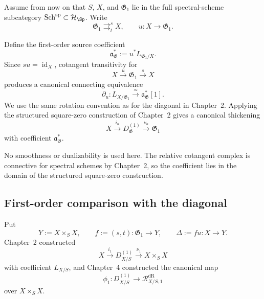 Assume from now on that $S$, $X$, and $\mathfrak G_1$ lie in the full
spectral-scheme subcategory $\operatorname{Sch}^{\mathrm{sp}}\subset
\mathcal H_{\Sp}$.  Write
\[
    \mathfrak G_1
    \mathop{\rightrightarrows}^{s}_{t}
    X,
    \qquad
    u:X\longrightarrow\mathfrak G_1.
\]

\begin{definition}
\label{def:first-unit-neighbourhood}
Define the first-order source coefficient
\[
    \mathfrak a_{\mathfrak G}^{*}
    :=
    u^*L_{\mathfrak G_1/X}.
\]
Since $su=\operatorname{id}_X$, cotangent transitivity for
\[
    X\xrightarrow{u}\mathfrak G_1\xrightarrow{s}X
\]
produces a canonical connecting equivalence
\[
    \partial_u:
    L_{X/\mathfrak G_1}
    \xrightarrow{\simeq}
    \mathfrak a_{\mathfrak G}^{*}[1].
\]
We use the same rotation convention as for the diagonal in Chapter~2.
Applying the structured square-zero construction of Chapter~2 gives a
canonical thickening
\[
    X\xrightarrow{i_u}D^{(1)}_{\mathfrak G}
    \xrightarrow{\nu_u}\mathfrak G_1
\]
with coefficient $\mathfrak a_{\mathfrak G}^{*}$.
\end{definition}

No smoothness or dualizability is used here.  The relative cotangent complex is
connective for spectral schemes by Chapter~2, so the coefficient lies in the domain of
the structured square-zero construction.

\subsection{First-order comparison with the diagonal}

Put
\[
    Y:=X\times_SX,
    \qquad
    f:=(s,t):\mathfrak G_1\longrightarrow Y,
    \qquad
    \Delta:=fu:X\longrightarrow Y.
\]
Chapter~2 constructed
\[
    X\xrightarrow{i_1}D^{(1)}_{X/S}
    \xrightarrow{\nu_1}X\times_SX
\]
with coefficient $L_{X/S}$, and Chapter~4 constructed the canonical map
\[
    \phi_1:
    D^{(1)}_{X/S}\longrightarrow \mathcal R^{\mathrm{dR}}_{X/S,1}
\]
over $X\times_SX$.

